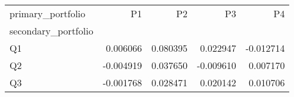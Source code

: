 \begin{tabular}{lrrrr}
\toprule
primary_portfolio & P1 & P2 & P3 & P4 \\
secondary_portfolio &  &  &  &  \\
\midrule
Q1 & 0.006066 & 0.080395 & 0.022947 & -0.012714 \\
Q2 & -0.004919 & 0.037650 & -0.009610 & 0.007170 \\
Q3 & -0.001768 & 0.028471 & 0.020142 & 0.010706 \\
\bottomrule
\end{tabular}
